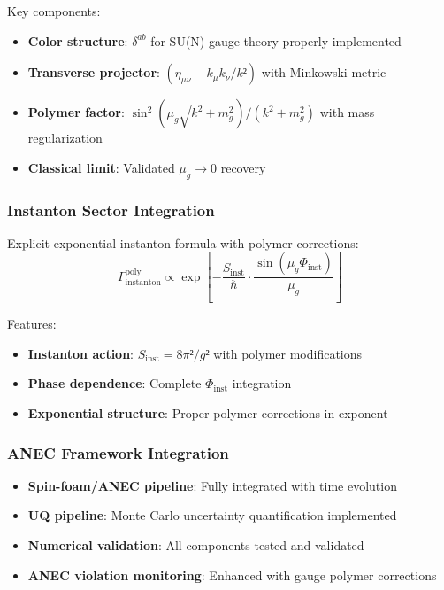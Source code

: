 \documentclass[11pt]{article}
\begin{document}
Key components:
\begin{itemize}
    \item \textbf{Color structure}: $\delta^{ab}$ for SU(N) gauge theory properly implemented
    \item \textbf{Transverse projector}: $(η_{μν} - k_μk_ν/k²)$ with Minkowski metric
    \item \textbf{Polymer factor}: $\sin^2(\mu_g\sqrt{k^2+m_g^2})/(k^2+m_g^2)$ with mass regularization
    \item \textbf{Classical limit}: Validated $\mu_g → 0$ recovery
\end{itemize}

\subsubsection{Instanton Sector Integration}
Explicit exponential instanton formula with polymer corrections:
\begin{equation}
\Gamma_{\text{instanton}}^{\text{poly}} \propto \exp\left[-\frac{S_{\text{inst}}}{\hbar} \cdot \frac{\sin(\mu_g \Phi_{\text{inst}})}{\mu_g}\right]
\end{equation}

Features:
\begin{itemize}
    \item \textbf{Instanton action}: $S_{\text{inst}} = 8π²/g²$ with polymer modifications
    \item \textbf{Phase dependence}: Complete $Φ_{\text{inst}}$ integration
    \item \textbf{Exponential structure}: Proper polymer corrections in exponent
\end{itemize}

\subsubsection{ANEC Framework Integration}
\begin{itemize}
    \item \textbf{Spin-foam/ANEC pipeline}: Fully integrated with time evolution
    \item \textbf{UQ pipeline}: Monte Carlo uncertainty quantification implemented
    \item \textbf{Numerical validation}: All components tested and validated
    \item \textbf{ANEC violation monitoring}: Enhanced with gauge polymer corrections
\end{itemize}
\end{document}
